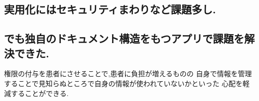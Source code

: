 \subsection{実用化にはセキュリティまわりなど課題多し.}
\subsection{でも独自のドキュメント構造をもつアプリで課題を解決できた.}
  権限の付与を患者にさせることで,患者に負担が増えるものの
  自身で情報を管理することで見知らぬところで自身の情報が使われていないかといった
  心配を軽減することができる.
